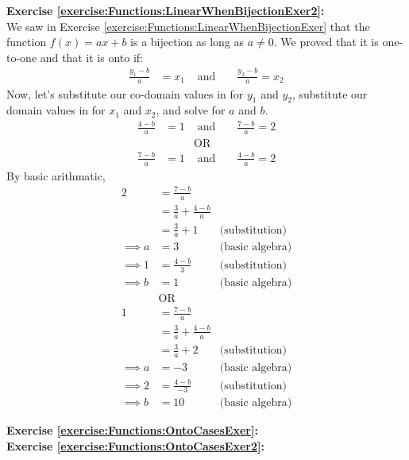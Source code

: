 \noindent\textbf{Exercise \ref{exercise:Functions:LinearWhenBijectionExer2}:}\\ %
We saw in Exercise \ref{exercise:Functions:LinearWhenBijectionExer} that the function $f(x) = ax + b$ is a bijection as long as $a\neq 0$. We proved that it is one-to-one and that it is onto if: 
\begin{align*}
\frac{y_{1} - b}{a} &= x_{1} &\text{\ and\ }& &\frac{y_{2} - b}{a} = x_{2}
\end{align*}
Now, let's substitute our co-domain values in for $y_{1}$ and $y_{2}$, substitute our domain values in for $x_{1}$ and $x_{2}$, and solve for $a$ and $b$.
\begin{align*}
\frac{4 - b}{a} &= 1 &\text{\ and\ }& &\frac{7 - b}{a} = 2\\
&&\text{OR}\\
\frac{7 - b}{a} &= 1 &\text{\ and\ }& &\frac{4 - b}{a} = 2
\end{align*}
By basic arithmatic,
\begin{align*}
2 &= \frac{7 - b}{a}\\
&= \frac{3}{a} + \frac{4 - b}{a} \\
&= \frac{3}{a} + 1 &\text{(substitution)}\\
\implies a &= 3 &\text{(basic algebra)}\\
\implies 1 &= \frac{4 - b}{3} &\text{(substitution)}\\
\implies b &= 1 &\text{(basic algebra)}\\
&\text{OR}\\
1 &= \frac{7 - b}{a}\\
&= \frac{3}{a} + \frac{4 - b}{a} \\
&= \frac{3}{a} + 2 &\text{(substitution)}\\
\implies a &= -3 &\text{(basic algebra)}\\
\implies 2 &= \frac{4 - b}{-3} &\text{(substitution)}\\
\implies b &= 10 &\text{(basic algebra)}
\end{align*}


\noindent\textbf{Exercise \ref{exercise:Functions:OntoCasesExer}:}\\ 

\noindent\textbf{Exercise \ref{exercise:Functions:OntoCasesExer2}:}\\   


